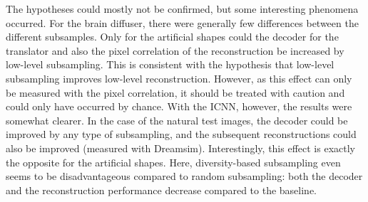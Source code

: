 

  
The hypotheses could mostly not be confirmed, but some interesting phenomena occurred. For the brain diffuser, there were generally few differences between the different subsamples. Only for the artificial shapes could the decoder for the translator and also the pixel correlation of the reconstruction be increased by low-level subsampling. This is consistent with the hypothesis that low-level subsampling improves low-level reconstruction. However, as this effect can only be measured with the pixel correlation, it should be treated with caution and could only have occurred by chance. With the ICNN, however, the results were somewhat clearer. In the case of the natural test images, the decoder could be improved by any type of subsampling, and the subsequent reconstructions could also be improved (measured with Dreamsim). Interestingly, this effect is exactly the opposite for the artificial shapes. Here, diversity-based subsampling even seems to be disadvantageous compared to random subsampling: both the decoder and the reconstruction performance decrease compared to the baseline. 

